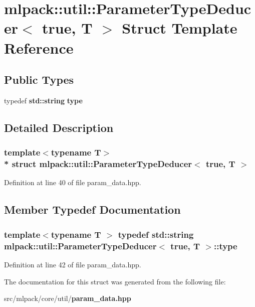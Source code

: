 \section{mlpack\+:\+:util\+:\+:Parameter\+Type\+Deducer$<$ true, T $>$ Struct Template Reference}
\label{structmlpack_1_1util_1_1ParameterTypeDeducer_3_01true_00_01T_01_4}
\subsection*{Public Types}
\begin{DoxyCompactItemize}
\item 
typedef {\bf std\+::string} {\bf type}
\end{DoxyCompactItemize}


\subsection{Detailed Description}
\subsubsection*{template$<$typename T$>$\\*
struct mlpack\+::util\+::\+Parameter\+Type\+Deducer$<$ true, T $>$}



Definition at line 40 of file param\+\_\+data.\+hpp.



\subsection{Member Typedef Documentation}
\subsubsection[{type}]{\setlength{\rightskip}{0pt plus 5cm}template$<$typename T $>$ typedef {\bf std\+::string} {\bf mlpack\+::util\+::\+Parameter\+Type\+Deducer}$<$ true, T $>$\+::{\bf type}}\label{structmlpack_1_1util_1_1ParameterTypeDeducer_3_01true_00_01T_01_4_aab2ef9294d9f96f7489dfde718e7080d}


Definition at line 42 of file param\+\_\+data.\+hpp.



The documentation for this struct was generated from the following file\+:\begin{DoxyCompactItemize}
\item 
src/mlpack/core/util/{\bf param\+\_\+data.\+hpp}\end{DoxyCompactItemize}
